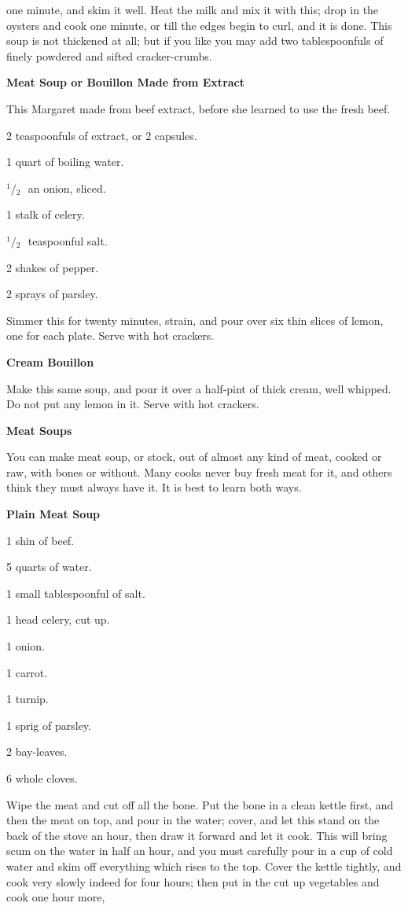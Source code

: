 \documentclass[11pt]{book}
\newcommand{\indpar}{\par\noindent\hspace*{\parindent}}
\newcommand{\ingredient}{\indpar}
\newcommand{\instruction}{\indpar}
\newcommand{\OneHalf}{\ensuremath{{}^1\!\!/\!{}_2\mbox{\ }}}
\newenvironment{RecipeTitle}{\medskip\begin{center}\large\bf }{\end{center}\smallskip}
\begin{document}
one minute, and skim it well.  Heat the milk and mix it
with this; drop in the oysters and cook one minute, or till
the edges begin to curl, and it is done.  This soup is
not thickened at all; but if you like you may add two
tablespoonfuls of finely powdered and sifted cracker-crumbs.
\begin{RecipeTitle}
Meat Soup or Bouillon Made from Extract\label{meat_soup_made_from_extract}
\end{RecipeTitle}
\indpar
  This Margaret made from beef extract, before she learned
to use the fresh beef.
\ingredient  2 teaspoonfuls of extract, or 2 capsules.
\ingredient  1 quart of boiling water.
\ingredient  \OneHalf an onion, sliced.
\ingredient  1 stalk of celery.
\ingredient  \OneHalf teaspoonful salt.
\ingredient  2 shakes of pepper.
\ingredient  2 sprays of parsley.
\instruction
  Simmer this for twenty minutes, strain, and pour over
six thin slices of lemon, one for each plate.  Serve with
hot crackers.
\begin{RecipeTitle}
Cream Bouillon\label{cream_bouillon}
\end{RecipeTitle}
  Make this same soup, and pour it over a half-pint of
thick cream, well whipped.  Do not put any lemon in it.
Serve with hot crackers.
\begin{RecipeTitle}
Meat Soups\label{meat_soups}
\end{RecipeTitle}
\instruction  You can make meat soup, or stock, out of almost any
kind of meat, cooked or raw, with bones or without.
Many cooks never buy fresh meat for it, and others think
they must always have it.  It is best to learn both ways.
\begin{RecipeTitle}
Plain Meat Soup\label{plain_meat_soup}
\end{RecipeTitle}
\ingredient  1 shin of beef.
\ingredient  5 quarts of water.
\ingredient  1 small tablespoonful of salt.
\ingredient  1 head celery, cut up.
\ingredient  1 onion.
\ingredient  1 carrot.
\ingredient  1 turnip.
\ingredient  1 sprig of parsley.
\ingredient  2 bay-leaves.
\ingredient  6 whole cloves.
\instruction  Wipe the meat and cut off all the bone.  Put the bone in a
clean kettle first, and then the meat on top, and pour in the
water; cover, and let this stand on the back of the stove an hour,
then draw it forward and let it cook.  This will bring scum on
the water in half an hour, and you must carefully pour in a
cup of cold water and skim off everything which rises to the top.
Cover the kettle tightly, and cook very slowly indeed for four
hours; then put in the cut up vegetables and cook one hour more,
\end{document}
